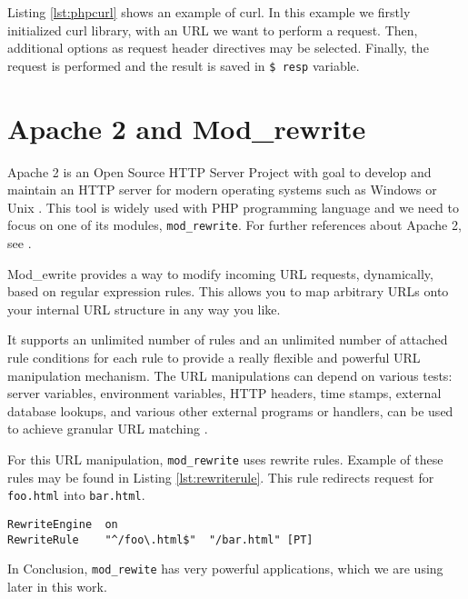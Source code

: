 Listing \ref{lst:phpcurl} shows an example of curl. In this example we firstly initialized curl library, with an URL we want to perform a request. Then, additional options as request header directives may be selected. Finally, the request is performed and the result is saved in \texttt{\$ resp} variable.

\section{Apache 2 and Mod\_rewrite}
Apache 2 is an Open Source HTTP Server Project with goal to develop and maintain an HTTP server for modern operating systems such as Windows or Unix \cite{modrewrite}. This tool is widely used with PHP programming language and we need to focus on one of its modules, \texttt{mod\_rewrite}. For further references about Apache 2, see \cite{modrewrite}.

Mod\_ewrite provides a way to modify incoming URL requests, dynamically, based on regular expression rules. This allows you to map arbitrary URLs onto your internal URL structure in any way you like.

It supports an unlimited number of rules and an unlimited number of attached rule conditions for each rule to provide a really flexible and powerful URL manipulation mechanism. The URL manipulations can depend on various tests: server variables, environment variables, HTTP headers, time stamps, external database lookups, and various other external programs or handlers, can be used to achieve granular URL matching \cite{modrewrite}.

For this URL manipulation, \texttt{mod\_rewrite} uses rewrite rules. Example of these rules may be found in Listing \ref{lst:rewriterule}. This rule redirects request for \texttt{foo.html} into \texttt{bar.html}. 



\begin{lstlisting}[caption={Example rewrite rule},label={lst:rewriterule}]
RewriteEngine  on
RewriteRule    "^/foo\.html$"  "/bar.html" [PT]
\end{lstlisting}

In Conclusion, \texttt{mod\_rewite} has very powerful applications, which we are using later in this work.








